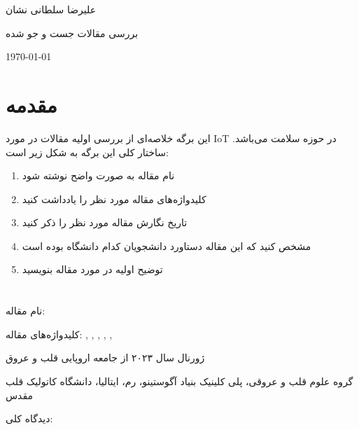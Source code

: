 \documentclass[10pt, a4paper]{article}
\begin{document}
\centerline{علیرضا سلطانی نشان}
\centerline{بررسی مقالات جست و جو شده}
\centerline{\today}
\tableofcontents

\section{مقدمه}

این برگه خلاصه‌ای از بررسی اولیه مقالات در مورد IoT در حوزه سلامت می‌باشد.
ساختار کلی این برگه به شکل زیر است:

\begin{enumerate}
    \item نام مقاله به صورت واضح نوشته شود
    \item کلیدواژه‌های مقاله مورد نظر را یادداشت کنید
    \item تاریخ نگارش مقاله مورد نظر را ذکر کنید
    \item مشخص کنید که این مقاله دستاورد دانشجویان کدام دانشگاه بوده است
    \item توضیح اولیه در مورد مقاله بنویسید
\end{enumerate}

\newpage

\section{}

نام مقاله: 

کلیدواژه‌های مقاله: 
,
,
,
,
,

ژورنال سال ۲۰۲۳ از جامعه اروپایی قلب و عروق

گروه علوم قلب و عروقی، پلی کلینیک بنیاد آگوستینو، رم، ایتالیا، دانشگاه کاتولیک قلب مقدس

دیدگاه کلی:
\end{document}
